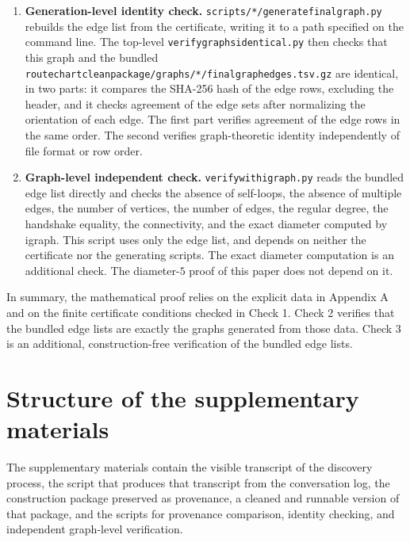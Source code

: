 \documentclass[11pt]{article}
\theoremstyle{definition}
\theoremstyle{remark}
\renewcommand{\_}{\textunderscore\allowbreak}
\begin{document}
\begin{enumerate}
\item
  \textbf{Generation-level identity check.}
  \texttt{scripts/*/generate\_final\_graph.py} rebuilds the edge list from
  the certificate, writing it to a path specified on the command line. The
  top-level \texttt{verify\_graphs\_identical.py} then checks that this graph
  and the bundled
  \texttt{route\_chart\_clean\_package/graphs/*/final\_graph\_edges.tsv.gz}
  are identical, in two parts: it compares the SHA-256 hash of the edge rows,
  excluding the header, and it checks agreement of the edge sets after
  normalizing the orientation of each edge. The first part verifies agreement
  of the edge rows in the same order. The second verifies graph-theoretic
  identity independently of file format or row order.
\item
  \textbf{Graph-level independent check.} \texttt{verify\_with\_igraph.py}
  reads the bundled edge list directly and checks the absence of self-loops,
  the absence of multiple edges, the number of vertices, the number of edges,
  the regular degree, the handshake equality, the connectivity, and the exact
  diameter computed by igraph. This script uses only the edge list,
  and depends on neither the certificate nor the generating scripts. The exact
  diameter computation is an additional check. The diameter-\(5\) proof of this paper does not depend on
  it.
\end{enumerate}

In summary, the mathematical proof relies on the explicit data in
Appendix A and on the finite certificate conditions checked in Check 1.
Check 2 verifies that the bundled edge lists are exactly the graphs
generated from those data. Check 3 is an additional, construction-free
verification of the bundled edge lists.


\section{Structure of the supplementary
materials}\label{appendix-b.-structure-of-the-supplementary-materials}

The supplementary materials contain the
visible transcript of the discovery process, the script that produces
that transcript from the conversation log, the construction package
preserved as provenance, a cleaned and runnable version of that package,
and the scripts for provenance comparison, identity
checking, and independent graph-level verification.
\end{document}
